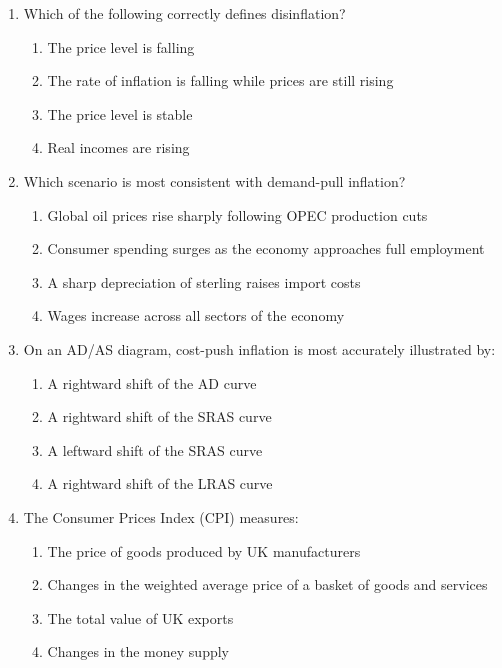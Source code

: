 \documentclass[12pt,a4paper]{article}
\begin{document}
\begin{enumerate}[leftmargin=*, label=\textbf{\arabic*.}]

    \item Which of the following correctly defines disinflation?
    \begin{enumerate}[label=(\Alph*), topsep=2pt]
        \item The price level is falling
        \item The rate of inflation is falling while prices are still rising
        \item The price level is stable
        \item Real incomes are rising
    \end{enumerate}

    \vspace{0.4em}

    \item Which scenario is most consistent with demand-pull inflation?
    \begin{enumerate}[label=(\Alph*), topsep=2pt]
        \item Global oil prices rise sharply following OPEC production cuts
        \item Consumer spending surges as the economy approaches full employment
        \item A sharp depreciation of sterling raises import costs
        \item Wages increase across all sectors of the economy
    \end{enumerate}

    \vspace{0.4em}

    \item On an AD/AS diagram, cost-push inflation is most accurately illustrated by:
    \begin{enumerate}[label=(\Alph*), topsep=2pt]
        \item A rightward shift of the AD curve
        \item A rightward shift of the SRAS curve
        \item A leftward shift of the SRAS curve
        \item A rightward shift of the LRAS curve
    \end{enumerate}

    \vspace{0.4em}

    \item The Consumer Prices Index (CPI) measures:
    \begin{enumerate}[label=(\Alph*), topsep=2pt]
        \item The price of goods produced by UK manufacturers
        \item Changes in the weighted average price of a basket of goods and services
        \item The total value of UK exports
        \item Changes in the money supply
    \end{enumerate}


\end{enumerate}
\end{document}
